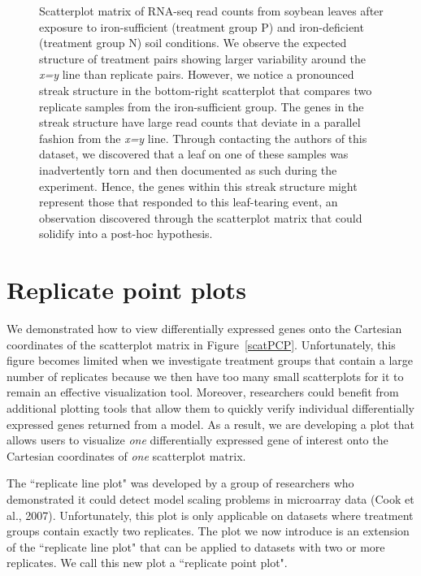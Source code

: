 \documentclass[referee]{biom}
\begin{document}
\begin{figure}
\begin{center}
\centerline{}
\end{center}
\caption{Scatterplot matrix of RNA-seq read counts from soybean leaves after exposure to iron-sufficient (treatment group P) and iron-deficient (treatment group N) soil conditions. We observe the expected structure of treatment pairs showing larger variability around the \textit{x=y} line than replicate pairs. However, we notice a pronounced streak structure in the bottom-right scatterplot that compares two replicate samples from the iron-sufficient group. The genes in the streak structure have large read counts that deviate in a parallel fashion from the \textit{x=y} line. Through contacting the authors of this dataset, we discovered that a leaf on one of these samples was inadvertently torn and then documented as such during the experiment. Hence, the genes within this streak structure might represent those that responded to this leaf-tearing event, an observation discovered through the scatterplot matrix that could solidify into a post-hoc hypothesis.
\label{structure}}
\end{figure}

\section{Replicate point plots}
\label{s:repPoint}

We demonstrated how to view differentially expressed genes onto the Cartesian coordinates of the scatterplot matrix in Figure~\ref{scatPCP}. Unfortunately, this figure becomes limited when we investigate treatment groups that contain a large number of replicates because we then have too many small scatterplots for it to remain an effective visualization tool. Moreover, researchers could benefit from additional plotting tools that allow them to quickly verify individual differentially expressed genes returned from a model. As a result, we are developing a plot that allows users to visualize \textit{one} differentially expressed gene of interest onto the Cartesian coordinates of \textit{one} scatterplot matrix.

The ``replicate line plot" was developed by a group of researchers who demonstrated it could detect model scaling problems in microarray data (Cook et al., 2007). Unfortunately, this plot is only applicable on datasets where treatment groups contain exactly two replicates. The plot we now introduce is an extension of the ``replicate line plot" that can be applied to datasets with two or more replicates. We call this new plot a ``replicate point plot".
\end{document}
